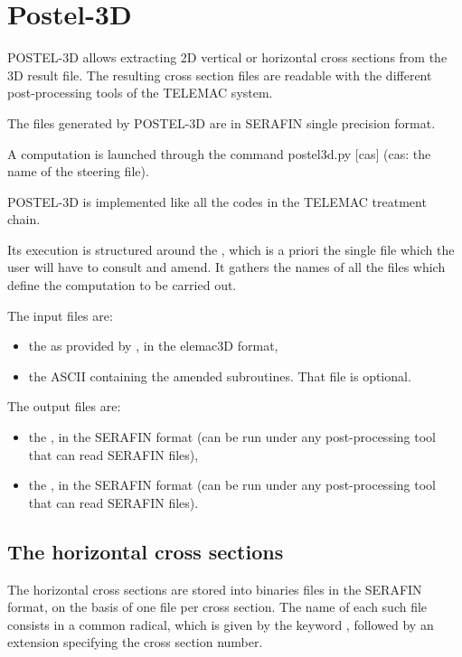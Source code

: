 \chapter{Postel-3D}

POSTEL-3D allows extracting 2D vertical or horizontal cross sections
from the 3D result file. The resulting cross section files are readable with
the different post-processing tools of the TELEMAC system.

The files generated by POSTEL-3D are in SERAFIN single precision format.

A computation is launched through the command postel3d.py [cas] (cas: the name
of the steering file).

POSTEL-3D is implemented like all the codes in the TELEMAC treatment chain.

Its execution is structured around the , which is a
priori the single file which the user will have to consult and amend. It
gathers the names of all the files which define the computation to be carried
out.

The input files are:

\begin{itemize}
\item the  as provided by , in the 	elemac{3D}
format,

\item the ASCII  containing the amended subroutines. That
file is optional.
\end{itemize}

The output files are:

\begin{itemize}
\item the , in the SERAFIN format (can
be run under any post-processing tool that can read SERAFIN files),

\item the , in the SERAFIN format (can be
run under any post-processing tool that can read SERAFIN files).
\end{itemize}



\section{The horizontal cross sections}

The horizontal cross sections are stored into binaries files in the SERAFIN
format, on the basis of one file per cross section. The name of each such file
consists in a common radical, which is given by the keyword , followed by an extension specifying the cross section
number.

